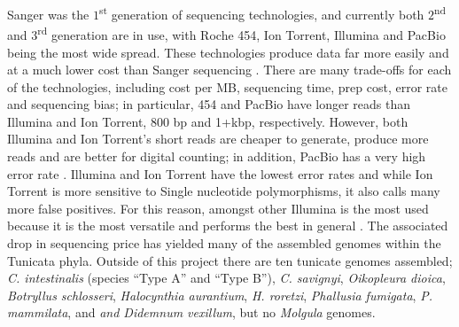 Sanger was the $1$\textsuperscript{st} generation of sequencing technologies, and currently both $2$\textsuperscript{nd} and $3$\textsuperscript{rd} generation are in use, with Roche 454, Ion Torrent, Illumina and PacBio being the most wide spread. These technologies produce data far more easily and at a much lower cost than Sanger sequencing \cite{metzker_emerging_2005}. There are many trade-offs for each of the technologies, including cost per MB, sequencing time, prep cost, error rate and sequencing bias; in particular, 454 and PacBio have longer reads than Illumina and Ion Torrent, 800 bp and 1+kbp, respectively. However, both Illumina and Ion Torrent's short reads are cheaper to generate, produce more reads and are better for digital counting; in addition, PacBio has a very high error rate \cite{glenn_field_2011}. Illumina and Ion Torrent have the lowest error rates and while Ion Torrent is more sensitive to Single nucleotide polymorphisms, it also calls many more false positives.  For this reason, amongst other Illumina is the most used because it is the most versatile and performs the best in general \cite{quail_tale_2012}. The associated drop in sequencing price has yielded many of the assembled genomes within the Tunicata phyla. Outside of this project there are ten tunicate genomes assembled; \textit{C. intestinalis} (species ``Type A'' and ``Type B''), \textit{C. savignyi}, \textit{Oikopleura dioica}, \textit{Botryllus schlosseri}, \textit{Halocynthia aurantium}, \textit{H. roretzi}, \textit{Phallusia fumigata}, \textit{P. mammilata}, and \textit{and Didemnum vexillum}, but no \textit{Molgula} genomes.
